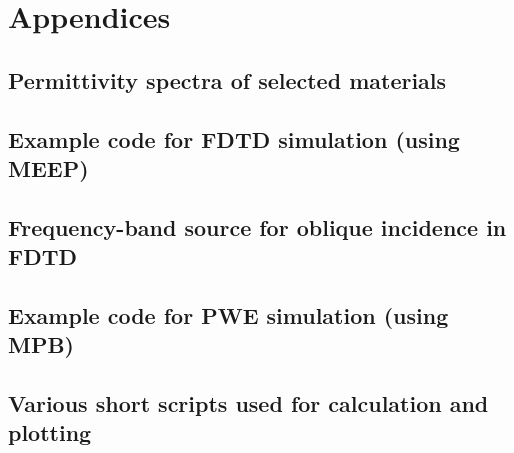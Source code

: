 \documentclass[letterpaper,12pt]{report}
\begin{document}
\chapter{Appendices}
	\section{Permittivity spectra of selected materials}
	\section{Example code for FDTD simulation (using MEEP)}
	\section{Frequency-band source for oblique incidence in FDTD}
	\section{Example code for PWE simulation (using MPB)}
	\section{Various short scripts used for calculation and plotting}
\label{endtext} 


\end{document}
